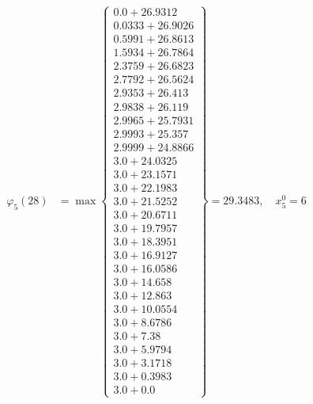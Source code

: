 \documentclass{article}
\begin{document}
\begin{align*}
  
\varphi_{5}(28) &= \max \left\{ \begin{array}{c}
0.0 + 26.9312 \\
 0.0333 + 26.9026 \\
 0.5991 + 26.8613 \\
 1.5934 + 26.7864 \\
 2.3759 + 26.6823 \\
 2.7792 + 26.5624 \\
 2.9353 + 26.413 \\
 2.9838 + 26.119 \\
 2.9965 + 25.7931 \\
 2.9993 + 25.357 \\
 2.9999 + 24.8866 \\
 3.0 + 24.0325 \\
 3.0 + 23.1571 \\
 3.0 + 22.1983 \\
 3.0 + 21.5252 \\
 3.0 + 20.6711 \\
 3.0 + 19.7957 \\
 3.0 + 18.3951 \\
 3.0 + 16.9127 \\
 3.0 + 16.0586 \\
 3.0 + 14.658 \\
 3.0 + 12.863 \\
 3.0 + 10.0554 \\
 3.0 + 8.6786 \\
 3.0 + 7.38 \\
 3.0 + 5.9794 \\
 3.0 + 3.1718 \\
 3.0 + 0.3983 \\
 3.0 + 0.0
\end{array} \right\}=29.3483,\quad x_{5}^0=6\\
  
  
  

\end{align*}
\end{document}

